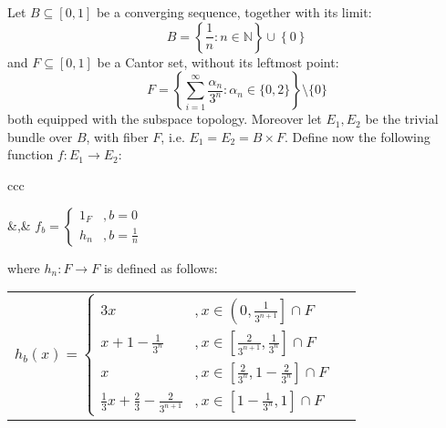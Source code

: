 \begin{example}\label{ex:counterexample} Let $B\subseteq[0,1]$ be a converging sequence, together with its limit:
\[B=\left\{\frac{1}{n}:n\in\mathbb{N}\right\}\cup\left\{0\right\}\]
and $F\subseteq[0,1]$ be a Cantor set, without its leftmost point:
\[F=\left\{\sum_{i=1}^{\infty}\frac{\alpha_n}{3^n}:\alpha_n\in\{0,2\}\right\}\setminus\{0\}\]
both equipped with the subspace topology. Moreover let $E_1,E_2$ be the trivial bundle over $B$, with fiber $F$, i.e. $E_1=E_2=B\times F$. Define now the following function $f:E_1\to E_2$:
\begin{center}
\begin{tabular}{ccc}
&,&
$\displaystyle f_b=\left\{\begin{array}{ll}
1_F&,b=0\\[1.2em]
h_n&,b=\frac{1}{n}
\end{array}\right.$
\end{tabular}
\end{center}
where $h_n:F\to F$ is defined as follows:
\begin{center}
\begin{tabular}{cc}
$\displaystyle h_b(x)=\left\{\begin{array}{ll}
3x&,x\in\left(0,\frac{1}{3^{n+1}}\right]\cap F\\[1em]
x+1-\frac{1}{3^n}&,x\in\left[\frac{2}{3^{n+1}},\frac{1}{3^n}\right]\cap F\\[1em]
x&,x\in\left[\frac{2}{3^n},1-\frac{2}{3^n}\right]\cap F\\[1em]
\frac{1}{3}x+\frac{2}{3}-\frac{2}{3^{n+1}}&,x\in\left[1-\frac{1}{3^n},1\right]\cap F
\end{array}\right.$
&
\end{tabular}
\end{center}
\end{example}
